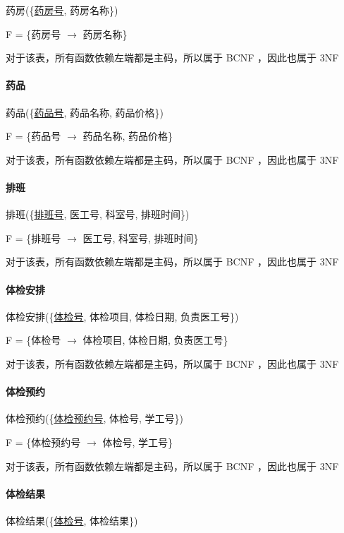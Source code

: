 \documentclass{article}
\begin{document}
药房(\{\underline{药房号}, 药房名称\})

F = \{药房号 $\rightarrow$ 药房名称\}

对于该表，所有函数依赖左端都是主码，所以属于 BCNF ，因此也属于 3NF

\paragraph{药品}

药品(\{\underline{药品号}, 药品名称, 药品价格\})

F = \{药品号 $\rightarrow$ 药品名称, 药品价格\}

对于该表，所有函数依赖左端都是主码，所以属于 BCNF ，因此也属于 3NF

\paragraph{排班}

排班(\{\underline{排班号}, 医工号, 科室号, 排班时间\})

F = \{排班号 $\rightarrow$ 医工号, 科室号, 排班时间\}

对于该表，所有函数依赖左端都是主码，所以属于 BCNF ，因此也属于 3NF

\paragraph{体检安排}

体检安排(\{\underline{体检号}, 体检项目, 体检日期, 负责医工号\})

F = \{体检号 $\rightarrow$ 体检项目, 体检日期, 负责医工号\}

对于该表，所有函数依赖左端都是主码，所以属于 BCNF ，因此也属于 3NF

\paragraph{体检预约}

体检预约(\{\underline{体检预约号}, 体检号, 学工号\})

F = \{体检预约号 $\rightarrow$ 体检号, 学工号\}

对于该表，所有函数依赖左端都是主码，所以属于 BCNF ，因此也属于 3NF

\paragraph{体检结果}

体检结果(\{\underline{体检号}, 体检结果\})
\end{document}
